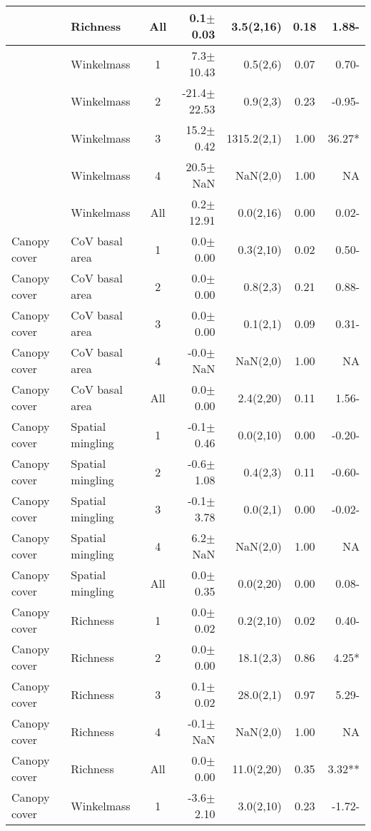 \begin{longtable}{llcrrS[table-format=1.2]r}
   & Richness & All & 0.1$\pm$0.03 & 3.5(2,16) & 0.18 & 1.88- \\ 
   \midrule
 & Winkelmass & 1 & 7.3$\pm$10.43 & 0.5(2,6) & 0.07 & 0.70- \\ 
   & Winkelmass & 2 & -21.4$\pm$22.53 & 0.9(2,3) & 0.23 & -0.95- \\ 
   & Winkelmass & 3 & 15.2$\pm$0.42 & 1315.2(2,1) & 1.00 & 36.27* \\ 
   & Winkelmass & 4 & 20.5$\pm$NaN & NaN(2,0) & 1.00 & NA \\ 
   & Winkelmass & All & 0.2$\pm$12.91 & 0.0(2,16) & 0.00 & 0.02- \\ 
   \midrule
Canopy cover & CoV basal area & 1 & 0.0$\pm$0.00 & 0.3(2,10) & 0.02 & 0.50- \\ 
  Canopy cover & CoV basal area & 2 & 0.0$\pm$0.00 & 0.8(2,3) & 0.21 & 0.88- \\ 
  Canopy cover & CoV basal area & 3 & 0.0$\pm$0.00 & 0.1(2,1) & 0.09 & 0.31- \\ 
  Canopy cover & CoV basal area & 4 & -0.0$\pm$NaN & NaN(2,0) & 1.00 & NA \\ 
  Canopy cover & CoV basal area & All & 0.0$\pm$0.00 & 2.4(2,20) & 0.11 & 1.56- \\ 
   \midrule
Canopy cover & Spatial mingling & 1 & -0.1$\pm$0.46 & 0.0(2,10) & 0.00 & -0.20- \\ 
  Canopy cover & Spatial mingling & 2 & -0.6$\pm$1.08 & 0.4(2,3) & 0.11 & -0.60- \\ 
  Canopy cover & Spatial mingling & 3 & -0.1$\pm$3.78 & 0.0(2,1) & 0.00 & -0.02- \\ 
  Canopy cover & Spatial mingling & 4 & 6.2$\pm$NaN & NaN(2,0) & 1.00 & NA \\ 
  Canopy cover & Spatial mingling & All & 0.0$\pm$0.35 & 0.0(2,20) & 0.00 & 0.08- \\ 
   \midrule
Canopy cover & Richness & 1 & 0.0$\pm$0.02 & 0.2(2,10) & 0.02 & 0.40- \\ 
  Canopy cover & Richness & 2 & 0.0$\pm$0.00 & 18.1(2,3) & 0.86 & 4.25* \\ 
  Canopy cover & Richness & 3 & 0.1$\pm$0.02 & 28.0(2,1) & 0.97 & 5.29- \\ 
  Canopy cover & Richness & 4 & -0.1$\pm$NaN & NaN(2,0) & 1.00 & NA \\ 
  Canopy cover & Richness & All & 0.0$\pm$0.00 & 11.0(2,20) & 0.35 & 3.32** \\ 
   \midrule
Canopy cover & Winkelmass & 1 & -3.6$\pm$2.10 & 3.0(2,10) & 0.23 & -1.72- \\ 

\end{longtable}
